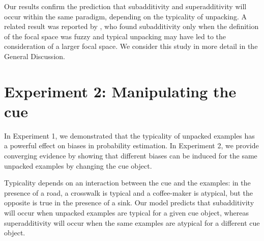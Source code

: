 Our results confirm the prediction that subadditivity and superadditivity will occur within the same paradigm, depending on the typicality of unpacking. A related result was reported by \citet{super}, who found subadditivity only when the definition of the focal space was fuzzy and typical unpacking may have led to the consideration of a larger focal space. We consider this study in more detail in the General Discussion.

\section{Experiment 2: Manipulating the cue}

In Experiment 1, we demonstrated that the typicality of unpacked examples has a powerful effect on biases in probability estimation. In Experiment 2, we provide converging evidence by showing that different biases can be induced for the same unpacked examples by changing the cue object.

Typicality depends on an interaction between the cue and the examples: in the presence of a road, a crosswalk is typical and a coffee-maker is atypical, but the opposite is true in the presence of a sink. Our model predicts that subadditivity will occur when unpacked examples are typical for a given cue object, whereas superadditivity will occur when the same examples are atypical for a different cue object.



